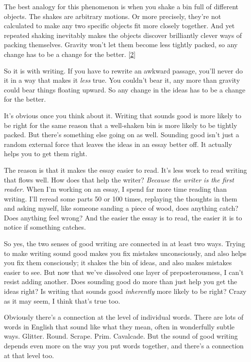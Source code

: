 The best analogy for this phenomenon is when you shake a
bin full of different objects. The shakes are arbitrary
motions. Or more precisely, they're not calculated to
make any two specific objects fit more closely together.
And yet repeated shaking inevitably makes the objects
discover brilliantly clever ways of packing themselves.
Gravity won't let them become less tightly packed, so any
change has to be a change for the better.
[\href{\#f2n}{2}]

So it is with writing. If you have to rewrite an awkward
passage, you'll never do it in a way that makes it \emph{less}
true. You couldn't bear it, any more than gravity could
bear things floating upward. So any change in the ideas
has to be a change for the better.

It's obvious once you think about it. Writing that sounds
good is more likely to be right for the same reason that
a well-shaken bin is more likely to be tightly packed.
But there's something else going on as well. Sounding
good isn't just a random external force that leaves the
ideas in an essay better off. It actually helps you to
get them right.

The reason is that it makes the essay easier to read.
It's less work to read writing that flows well. How does
that help the writer? \emph{Because the writer is the first
reader.} When I'm working on an essay, I spend far more
time reading than writing. I'll reread some parts 50 or
100 times, replaying the thoughts in them and asking
myself, like someone sanding a piece of wood, does
anything catch? Does anything feel wrong? And the easier
the essay is to read, the easier it is to notice if
something catches.

So yes, the two senses of good writing are connected in
at least two ways. Trying to make writing sound good
makes you fix mistakes unconsciously, and also helps you
fix them consciously; it shakes the bin of ideas, and
also makes mistakes easier to see. But now that we've
dissolved one layer of preposterousness, I can't resist
adding another. Does sounding good do more than just help
you get the ideas right? Is writing that sounds good
\emph{inherently} more likely to be right? Crazy as it may
seem, I think that's true too.

Obviously there's a connection at the level of individual
words. There are lots of words in English that sound like
what they mean, often in wonderfully subtle ways.
Glitter. Round. Scrape. Prim. Cavalcade. But the sound of
good writing depends even more on the way you put words
together, and there's a connection at that level too.

